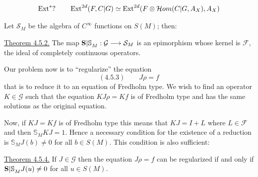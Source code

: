 \[
{\operatorname{Ext}^{{*}}?}\qquad\operatorname{Ext}^{2d}(F,{C|G})\simeq\operatorname{Ext}^{2d}(F\otimes\mathcal{H}om({C|G},A_X),A_X)
\]

Let $\mathcal{S}_M$ be the algebra of $C^\infty$ functions on $S(M)$; then:

\uline{Theorem 4.5.2.} The map ${\mathbf{S}|\mathbb{S}}_M:\mathcal{G}\longrightarrow\mathcal{S}_M$ is an epimorphism whose kernel is $\mathcal{F}$, the ideal of completely continuous operators.

Our problem now is to ``regularize'' the equation
\[
(4.5.3)\qquad J\rho=f
\]
that is to reduce it to an equation of Fredholm type. We wish to find an operator $K\in\mathcal{G}$ such that the equation $KJ\rho=Kf$ is of Fredholm type and has the same solutions as the original equation.

Now, if $KJ=Kf$ is of Fredholm type this means that $KJ=I+L$ where $L\in\mathcal{F}$ and then $\mathbb{S}_MKJ=1$. Hence a necessary condition for the existence of a reduction is $\mathbb{S}_MJ(b)\neq0$ for all $b\in S(M)$. This condition is also sufficient:

\uline{Theorem 4.5.4.} If $J\in\mathcal{G}$ then the equation $J\rho=f$ can be regularized if and only if ${\mathbf{S}|\mathbb{S}}_MJ(u)\neq0$ for all $u\in S(M)$.

